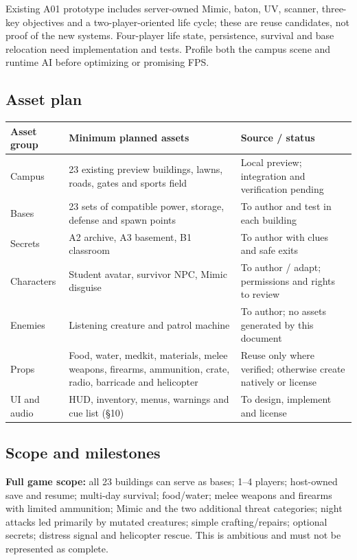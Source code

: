 Existing A01 prototype includes server-owned Mimic, baton, UV, scanner, three-key objectives and a two-player-oriented life cycle; these are reuse candidates, not proof of the new systems. Four-player life state, persistence, survival and base relocation need implementation and tests. Profile both the campus scene and runtime AI before optimizing or promising FPS.


\subsection{Asset plan}
\begin{longtable}{@{}p{}p{}p{}@{}}
\toprule
\textbf{Asset group} & \textbf{Minimum planned assets} & \textbf{Source / status} \\ \midrule\endhead
Campus & 23 existing preview buildings, lawns, roads, gates and sports field & Local preview; integration and verification pending \\
Bases & 23 sets of compatible power, storage, defense and spawn points & To author and test in each building \\
Secrets & A2 archive, A3 basement, B1 classroom & To author with clues and safe exits \\
Characters & Student avatar, survivor NPC, Mimic disguise & To author / adapt; permissions and rights to review \\
Enemies & Listening creature and patrol machine & To author; no assets generated by this document \\
Props & Food, water, medkit, materials, melee weapons, firearms, ammunition, crate, radio, barricade and helicopter & Reuse only where verified; otherwise create natively or license \\
UI and audio & HUD, inventory, menus, warnings and cue list (§10) & To design, implement and license \\
\bottomrule
\end{longtable}

\subsection{Scope and milestones}
\textbf{Full game scope:} all 23 buildings can serve as bases; 1--4 players; host-owned save and resume; multi-day survival; food/water; melee weapons and firearms with limited ammunition; Mimic and the two additional threat categories; night attacks led primarily by mutated creatures; simple crafting/repairs; optional secrets; distress signal and helicopter rescue. This is ambitious and must not be represented as complete.


